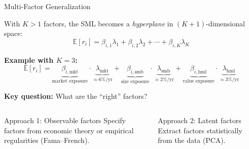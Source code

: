 \documentclass[aspectratio=169]{beamer}
\newcommand{\E}{\mathbb{E}}
\begin{document}
\begin{frame}{Multi-Factor Generalization}

With $K > 1$ factors, the SML becomes a \emph{hyperplane} in $(K+1)$-dimensional space:
\[
\E[r_i] = \beta_{i,1}\lambda_1 + \beta_{i,2}\lambda_2 + \cdots + \beta_{i,K}\lambda_K
\]

\vspace{0.5em}
\textbf{Example with $K = 3$:}
\[
\E[r_i] = \underbrace{\beta_{i,\text{mkt}}}_{\text{market exposure}} \cdot \underbrace{\lambda_{\text{mkt}}}_{\approx 6\%/\text{yr}} + \underbrace{\beta_{i,\text{smb}}}_{\text{size exposure}} \cdot \underbrace{\lambda_{\text{smb}}}_{\approx 2\%/\text{yr}} + \underbrace{\beta_{i,\text{hml}}}_{\text{value exposure}} \cdot \underbrace{\lambda_{\text{hml}}}_{\approx 3\%/\text{yr}}
\]

\vspace{0.5em}
\textbf{Key question:} What are the ``right'' factors?

\vspace{0.3em}
\begin{columns}[T]
\begin{block}{Approach 1: Observable factors}
Specify factors from economic theory or empirical regularities (Fama--French).
\end{block}

\begin{block}{Approach 2: Latent factors}
Extract factors statistically from the data (PCA).
\end{block}
\end{columns}
\end{frame}
%
\end{document}
